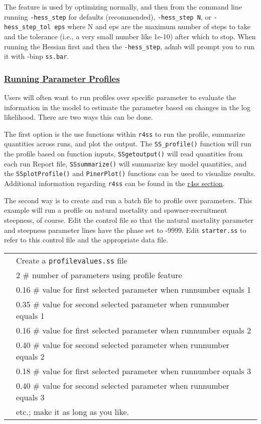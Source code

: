 The feature is used by optimizing normally, and then from the command line running \texttt{-hess\_step} for defaults (recommended), \texttt{-hess\_step N}, or \texttt{-hess\_step\_tol eps} where N and eps are the maximum number of steps to take and the tolerance (i.e., a very small number like 1e-10) after which to stop. When running the Hessian first and then the \texttt{-hess\_step}, \gls{admb} will prompt you to run it with -binp \texttt{ss.bar}.

\hypertarget{ParamProfiles}{}
\subsubsection[Running Parameter Profiles]{\protect\hyperlink{ParamProfiles}{Running Parameter Profiles}}
Users will often want to run profiles over specific parameter to evaluate the information in the model to estimate the parameter based on changes in the log likelihood. There are two ways this can be done.

The first option is the use functions within \texttt{r4ss} to run the profile, summarize quantities across runs, and plot the output. The \texttt{SS\_profile()} function will run the profile based on function inputs, \texttt{SSgetoutput()} will read quantities from each run Report file, \texttt{SSsummarize()} will summarize key model quantities, and the \texttt{SSplotProfile()} and \texttt{PinerPlot()} functions can be used to visualize results. Additional information regarding \texttt{r4ss} can be found in the \hyperref[sec:r4ss]{r4ss section}. 

The second way is to create and run a batch file to profile over parameters. This example will run a profile on natural mortality and spawner-recruitment steepness, of course. Edit the control file so that the natural mortality parameter and steepness parameter lines have the phase set to -9999. Edit \texttt{starter.ss} to refer to this control file and the appropriate data file.

	\begin{longtable}{p{0.5cm} p{16cm}}		
		& Create a \texttt{profilevalues.ss} file \\
		& 2	\# number of parameters using profile feature \\
		& 0.16	\# value for first selected parameter when runnumber equals 1 \\
		& 0.35	\# value for second selected parameter when runnumber equals 1 \\
		& 0.16	\# value for first selected parameter when runnumber equals 2 \\
		& 0.40	\# value for second selected parameter when runnumber equals 2 \\
		& 0.18	\# value for first selected parameter when runnumber equals 3 \\
		& 0.40	\# value for second selected parameter when runnumber equals 3 \\
		& etc.;  make it as long as you like. \\
	\end{longtable}

